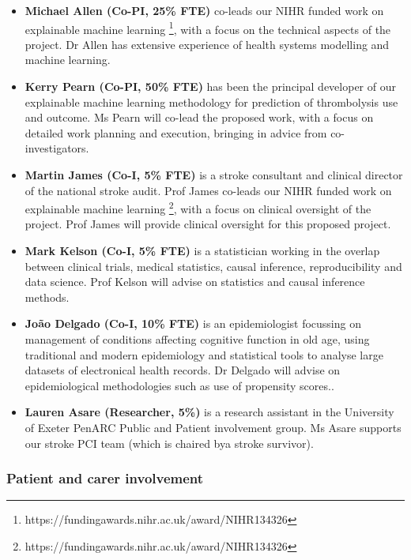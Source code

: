 \begin{itemize}

    \item \textbf{Michael Allen (Co-PI, 25\% FTE)} co-leads our NIHR funded work on explainable machine learning \footnote{https://fundingawards.nihr.ac.uk/award/NIHR134326}, with a focus on the technical aspects of the project. Dr Allen has extensive experience of health systems modelling and machine learning.

    \item \textbf{Kerry Pearn (Co-PI, 50\% FTE)} has been the principal developer of our explainable machine learning methodology for prediction of thrombolysis use and outcome. Ms Pearn will co-lead the proposed work, with a focus on detailed work planning and execution, bringing in advice from co-investigators.

    \item \textbf{Martin James (Co-I, 5\% FTE)} is a stroke consultant and clinical director of the national stroke audit. Prof James co-leads our NIHR funded work on explainable machine learning \footnote{https://fundingawards.nihr.ac.uk/award/NIHR134326}, with a focus on clinical oversight of the project. Prof James will provide clinical oversight for this proposed project.

    \item \textbf{Mark Kelson (Co-I, 5\% FTE)} is a statistician working in the overlap between clinical trials, medical statistics, causal inference, reproducibility and data science. Prof Kelson will advise on statistics and causal inference methods.

    \item \textbf{João Delgado (Co-I, 10\% FTE)} is an epidemiologist focussing on management of conditions affecting cognitive function in old age, using traditional and modern epidemiology and statistical tools to analyse large datasets of electronical health records. Dr Delgado will advise on epidemiological methodologies such as use of propensity scores..

    \item \textbf{Lauren Asare (Researcher, 5\%)} is a research assistant in the University of Exeter PenARC Public and Patient involvement group. Ms Asare supports our stroke PCI team (which is chaired bya stroke survivor).

\end{itemize}

\subsubsection{Patient and carer involvement}

